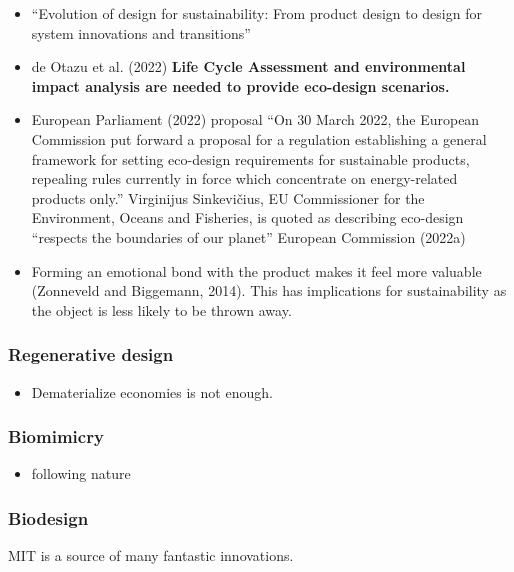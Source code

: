\documentclass[
  letterpaper,
  DIV=11,
  numbers=noendperiod]{scrartcl}
\providecommand{\tightlist}{%
  \setlength{\itemsep}{0pt}\setlength{\parskip}{0pt}}\usepackage{longtable,booktabs,array}
\begin{document}
\begin{itemize}
\item
  ``Evolution of design for sustainability: From product design to
  design for system innovations and transitions''
\item
  de Otazu et al. (2022) \textbf{Life Cycle Assessment and environmental
  impact analysis are needed to provide eco-design scenarios.}
\item
  European Parliament (2022) proposal ``On 30 March 2022, the European
  Commission put forward a proposal for a regulation establishing a
  general framework for setting eco-design requirements for sustainable
  products, repealing rules currently in force which concentrate on
  energy-related products only.'' Virginijus Sinkevičius, EU
  Commissioner for the Environment, Oceans and Fisheries, is quoted as
  describing eco-design ``respects the boundaries of our planet''
  European Commission (2022a)
\item
  Forming an emotional bond with the product makes it feel more valuable
  (Zonneveld and Biggemann, 2014). This has implications for
  sustainability as the object is less likely to be thrown away.
\end{itemize}

\subsubsection{Regenerative design}\label{regenerative-design}

\begin{itemize}
\tightlist
\item
  Dematerialize economies is not enough.
\end{itemize}

\subsubsection{Biomimicry}\label{biomimicry}

\begin{itemize}
\tightlist
\item
  following nature
\end{itemize}

\subsubsection{Biodesign}\label{biodesign}

MIT is a source of many fantastic innovations.
\end{document}
